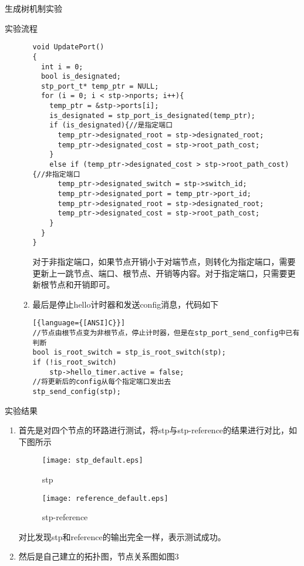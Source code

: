 \documentclass{article} %
\begin{document}
\begin{section}{生成树机制实验}
\begin{subsection}{实验流程}
\begin{enumerate}[1)]
\begin{enumerate}[(1)]
						\begin{lstlisting}[language={[ANSI]C}]
void UpdatePort()
{
  int i = 0;
  bool is_designated;
  stp_port_t* temp_ptr = NULL;
  for (i = 0; i < stp->nports; i++){
	temp_ptr = &stp->ports[i];
	is_designated = stp_port_is_designated(temp_ptr);
	if (is_designated){//是指定端口
	  temp_ptr->designated_root = stp->designated_root;
	  temp_ptr->designated_cost = stp->root_path_cost;
	}
	else if (temp_ptr->designated_cost > stp->root_path_cost){//非指定端口
   	  temp_ptr->designated_switch = stp->switch_id;
	  temp_ptr->designated_port = temp_ptr->port_id;
	  temp_ptr->designated_root = stp->designated_root;
	  temp_ptr->designated_cost = stp->root_path_cost;
	}
  }
}
						\end{lstlisting}
						对于非指定端口，如果节点开销小于对端节点，则转化为指定端口，需要更新上一跳节点、端口、根节点、开销等内容。对于指定端口，只需要更新根节点和开销即可。
						\item 最后是停止hello计时器和发送config消息，代码如下\\
						\begin{lstlisting}[{language={[ANSI]C}}]
//节点由根节点变为非根节点，停止计时器，但是在stp_port_send_config中已有判断
bool is_root_switch = stp_is_root_switch(stp);
if (!is_root_switch)
	stp->hello_timer.active = false;	
//将更新后的config从每个指定端口发出去
stp_send_config(stp);
						\end{lstlisting}
					\end{enumerate}
			\end{enumerate}
			\end{subsection}
		\begin{subsection}{实验结果}
			\begin{enumerate}[1)]
				\item 首先是对四个节点的环路进行测试，将stp与stp-reference的结果进行对比，如下图所示\\
				\begin{figure}[!h]	
					\centering
					\texttt{[image: stp\_default.eps]}	
					\caption{stp}
				\end{figure}	
			\begin{figure}[!h]	
				\centering
				\texttt{[image: reference\_default.eps]}	
				\caption{stp-reference}
			\end{figure}
			对比发现stp和reference的输出完全一样，表示测试成功。
				\item 然后是自己建立的拓扑图，节点关系图如图3\\
				\begin{figure*}

\end{figure*}
\end{enumerate}
\end{subsection}
\end{section}
\end{document}
